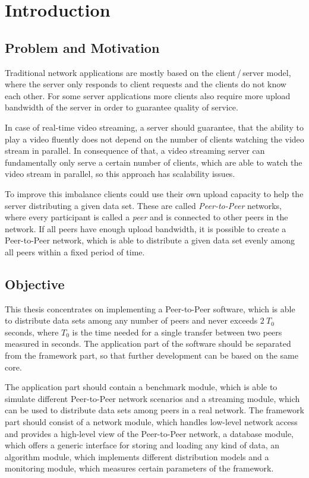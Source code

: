 
\chapter{Introduction}
\section{Problem and Motivation}
Traditional network applications are mostly based on the client\,/\,server model, where the server only responds to client requests and the clients do not know each other. For some server applications more clients also require more upload bandwidth of the server in order to guarantee quality of service.

In case of real-time video streaming, a server should guarantee, that the ability to play a video fluently does not depend on the number of clients watching the video stream in parallel. In consequence of that, a video streaming server can fundamentally only serve a certain number of clients, which are able to watch the video stream in parallel, so this approach has scalability issues.

To improve this imbalance clients could use their own upload capacity to help the server distributing a given data set. These are called \emph{Peer-to-Peer} networks, where every participant is called a \emph{peer} and is connected to other peers in the network.  If all peers have enough upload bandwidth, it is possible to create a Peer-to-Peer network, which is able to distribute a given data set evenly among all peers within a fixed period of time.
\vfill

\section{Objective}
This thesis concentrates on implementing a Peer-to-Peer software, which is able to distribute data sets among any number of peers and never exceeds $2\:T_0$ seconds, where $T_0$ is the time needed for a single transfer between two peers measured in seconds. The application part of the software should be separated from the framework part, so that further development can be based on the same core.

The application part should contain a benchmark module, which is able to simulate different Peer-to-Peer network scenarios and a streaming module, which can be used to distribute data sets among peers in a real network. The framework part should consist of a network module, which handles low-level network access and provides a high-level view of the Peer-to-Peer network, a database module, which offers a generic interface for storing and loading any kind of data, an algorithm module, which implements different distribution models and a monitoring module, which measures certain parameters of the framework.

